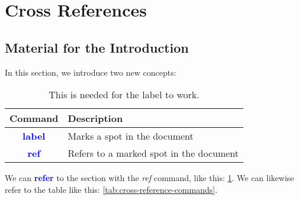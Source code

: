 \documentclass{article}
\newcommand{\kw}[1]{\textcolor{blue}{\textbf{#1}}}
\newcommand{\cmd}[1]{\textit{#1}}
\begin{document}
\section{Cross References}
\label{sec:cross-references}

\subsection{Material for the Introduction}

In this section, we introduce two new concepts:

\begin{table}[ht] %
  \begin{tabular}{cp{9cm}}
     Command & Description \\
     \toprule
     \kw{label} & Marks a spot in the document \\
     \kw{ref} & Refers to a marked spot in the document \\
     \bottomrule
  \end{tabular}
  \caption{This is needed for the label to work.}
  \label{tab:cross-reference-command} %
\end{table}

We can \kw{refer} to the section with the \cmd{ref} command, like this: \ref{sec:cross-references}.
We can likewise refer to the table like this: \ref{tab:cross-reference-commands}.
\end{document}
